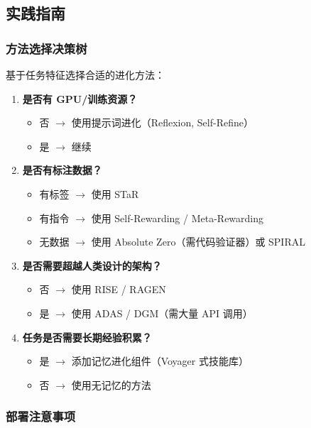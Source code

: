 \subsection{实践指南}\label{sec:ch3-practice}

\subsubsection{方法选择决策树}

基于任务特征选择合适的进化方法：

\begin{enumerate}
\item \textbf{是否有 GPU/训练资源？}
\begin{itemize}
\item 否 $\rightarrow$ 使用提示词进化（Reflexion, Self-Refine）
\item 是 $\rightarrow$ 继续
\end{itemize}

\item \textbf{是否有标注数据？}
\begin{itemize}
\item 有标签 $\rightarrow$ 使用 STaR
\item 有指令 $\rightarrow$ 使用 Self-Rewarding / Meta-Rewarding
\item 无数据 $\rightarrow$ 使用 Absolute Zero（需代码验证器）或 SPIRAL
\end{itemize}

\item \textbf{是否需要超越人类设计的架构？}
\begin{itemize}
\item 否 $\rightarrow$ 使用 RISE / RAGEN
\item 是 $\rightarrow$ 使用 ADAS / DGM（需大量 API 调用）
\end{itemize}

\item \textbf{任务是否需要长期经验积累？}
\begin{itemize}
\item 是 $\rightarrow$ 添加记忆进化组件（Voyager 式技能库）
\item 否 $\rightarrow$ 使用无记忆的方法
\end{itemize}
\end{enumerate}

\subsubsection{部署注意事项}

